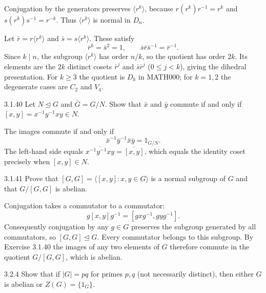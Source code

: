 \documentclass[11pt,oneside]{article}
\begin{document}
\begin{solution}
\begin{exercisesubparts}
\item Conjugation by the generators preserves $\langle r^k\rangle$, because $r(r^k)r^{-1}=r^k$ and $s(r^k)s^{-1}=r^{-k}$. Thus $\langle r^k\rangle$ is normal in $D_n$.
\item Let $\bar r=r\langle r^k\rangle$ and $\bar s=s\langle r^k\rangle$. These satisfy
\[
\bar r^k=\bar s^2=1,\qquad \bar s\bar r\bar s^{-1}=\bar r^{-1}.
\]
Since $k\mid n$, the subgroup $\langle r^k\rangle$ has order $n/k$, so the quotient has order $2k$. Its elements are the $2k$ distinct cosets $\bar r^j$ and $\bar s\bar r^j$ ($0\le j<k$), giving the dihedral presentation. For $k\ge3$ the quotient is $D_k$ in MATH000; for $k=1,2$ the degenerate cases are $C_2$ and $V_4$. 
\end{exercisesubparts}
\end{solution}

\begin{exercise}{3.1.40}
Let $N\trianglelefteq G$ and $\bar G=G/N$. Show that $\bar x$ and $\bar y$ commute if and only if $[x,y]=x^{-1}y^{-1}xy\in N$.
\end{exercise}

\begin{solution}
The images commute if and only if
\[
\bar x^{-1}\bar y^{-1}\bar x\bar y=1_{G/N}.
\]
The left-hand side equals $\overline{x^{-1}y^{-1}xy}=\overline{[x,y]}$, which equals the identity coset precisely when $[x,y]\in N$.
\end{solution}

\begin{exercise}{3.1.41}
Prove that $[G,G]=\langle[x,y]:x,y\in G\rangle$ is a normal subgroup of $G$ and that $G/[G,G]$ is abelian.
\end{exercise}

\begin{solution}
Conjugation takes a commutator to a commutator:
\[
 g[x,y]g^{-1}=[gxg^{-1},gyg^{-1}].
\]
Consequently conjugation by any $g\in G$ preserves the subgroup generated by all commutators, so $[G,G]\trianglelefteq G$. Every commutator belongs to this subgroup. By Exercise 3.1.40 the images of any two elements of $G$ therefore commute in the quotient $G/[G,G]$, which is abelian.
\end{solution}

\begin{exercise}{3.2.4}
Show that if $|G|=pq$ for primes $p,q$ (not necessarily distinct), then either $G$ is abelian or $Z(G)=\{1_G\}$.
\end{exercise}
\end{document}
